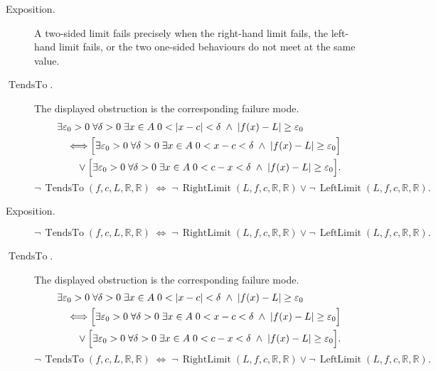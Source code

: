 \begin{remark*}
\begin{description}
  \item[Exposition.]
A two-sided limit fails precisely when the right-hand limit fails, the
left-hand limit fails, or the two one-sided behaviours do not meet at the
same value.


  \item[\(\operatorname{TendsTo}.\)]
  The displayed obstruction is the corresponding failure mode.
  \[
\begin{aligned}
&\exists\varepsilon_0>0\;\forall\delta>0\;\exists x\in A\;
  0<|x-c|<\delta\;\wedge\; |f(x)-L|\geq\varepsilon_0 \\
&\quad\Longleftrightarrow
\Bigl[\exists\varepsilon_0>0\;\forall\delta>0\;\exists x\in A\;
  0<x-c<\delta\;\wedge\; |f(x)-L|\geq\varepsilon_0\Bigr] \\
&\qquad\vee
\Bigl[\exists\varepsilon_0>0\;\forall\delta>0\;\exists x\in A\;
  0<c-x<\delta\;\wedge\; |f(x)-L|\geq\varepsilon_0\Bigr].
\end{aligned}
  \]
  \[
\neg\,\operatorname{TendsTo}(f,c,L,\mathbb{R},\mathbb{R})
  \;\Longleftrightarrow\;
  \neg\,\operatorname{RightLimit}(L,f,c,\mathbb{R},\mathbb{R})\vee\neg\,\operatorname{LeftLimit}(L,f,c,\mathbb{R},\mathbb{R}).
  \]
\end{description}
\end{remark*}

\begin{remark*}
\begin{description}
  \item[Exposition.]
\[
  \neg\,\operatorname{TendsTo}(f,c,L,\mathbb{R},\mathbb{R})
  \;\Longleftrightarrow\;
  \neg\,\operatorname{RightLimit}(L,f,c,\mathbb{R},\mathbb{R})\vee\neg\,\operatorname{LeftLimit}(L,f,c,\mathbb{R},\mathbb{R}).
\]


  \item[\(\operatorname{TendsTo}.\)]
  The displayed obstruction is the corresponding failure mode.
  \[
\begin{aligned}
&\exists\varepsilon_0>0\;\forall\delta>0\;\exists x\in A\;
  0<|x-c|<\delta\;\wedge\; |f(x)-L|\geq\varepsilon_0 \\
&\quad\Longleftrightarrow
\Bigl[\exists\varepsilon_0>0\;\forall\delta>0\;\exists x\in A\;
  0<x-c<\delta\;\wedge\; |f(x)-L|\geq\varepsilon_0\Bigr] \\
&\qquad\vee
\Bigl[\exists\varepsilon_0>0\;\forall\delta>0\;\exists x\in A\;
  0<c-x<\delta\;\wedge\; |f(x)-L|\geq\varepsilon_0\Bigr].
\end{aligned}
  \]
  \[
\neg\,\operatorname{TendsTo}(f,c,L,\mathbb{R},\mathbb{R})
  \;\Longleftrightarrow\;
  \neg\,\operatorname{RightLimit}(L,f,c,\mathbb{R},\mathbb{R})\vee\neg\,\operatorname{LeftLimit}(L,f,c,\mathbb{R},\mathbb{R}).
  \]
\end{description}
\end{remark*}

